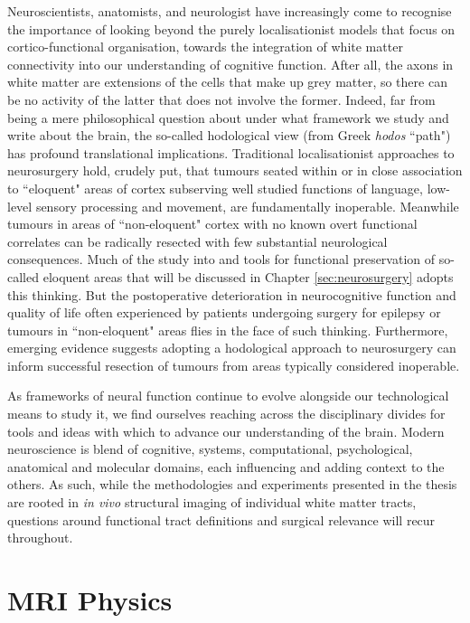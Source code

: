 Neuroscientists, anatomists, and neurologist have increasingly come to recognise the importance of looking beyond the purely localisationist models that focus on cortico-functional organisation, towards the integration of white matter connectivity into our understanding of cognitive function.\autocite{ffytche2005,Catani2007}
After all, the axons in white matter are extensions of the cells that make up grey matter, so there can be no activity of the latter that does not involve the former.
Indeed, far from being a mere philosophical question about under what framework we study and write about the brain, the so-called hodological view (from Greek \textit{hodos} ``path") has profound translational implications.
Traditional localisationist approaches to neurosurgery hold, crudely put, that tumours seated within or in close association to ``eloquent" areas of cortex subserving well studied functions of language, low-level sensory processing and movement, are fundamentally inoperable.
Meanwhile tumours in areas of ``non-eloquent" cortex with no known overt functional correlates can be radically resected with few substantial neurological consequences.
Much of the study into and tools for functional preservation of so-called eloquent areas that will be discussed in Chapter \ref{sec:neurosurgery} adopts this thinking.
But the postoperative deterioration in neurocognitive function and quality of life often experienced by patients undergoing surgery for epilepsy or tumours in ``non-eloquent" areas flies in the face of such thinking.
\autocite{Satoer2017,Mandonnet2017a,Rijnen2019,Herbet2019,Vigren2020a,Dadario2021}
Furthermore, emerging evidence suggests adopting a hodological approach to neurosurgery can inform successful resection of tumours from areas typically considered inoperable.\autocite{Dadario2021,DeBenedictis2011b,Suzuki2023}

As frameworks of neural function continue to evolve alongside our technological means to study it, we find ourselves reaching across the disciplinary divides for tools and ideas with which to advance our understanding of the brain.
Modern neuroscience is blend of cognitive, systems, computational, psychological, anatomical and molecular domains, each influencing and adding context to the others.
As such, while the methodologies and experiments presented in the thesis are rooted in \textit{in vivo} structural imaging of individual white matter tracts, questions around functional tract definitions and surgical relevance will recur throughout.

\section{MRI Physics}

